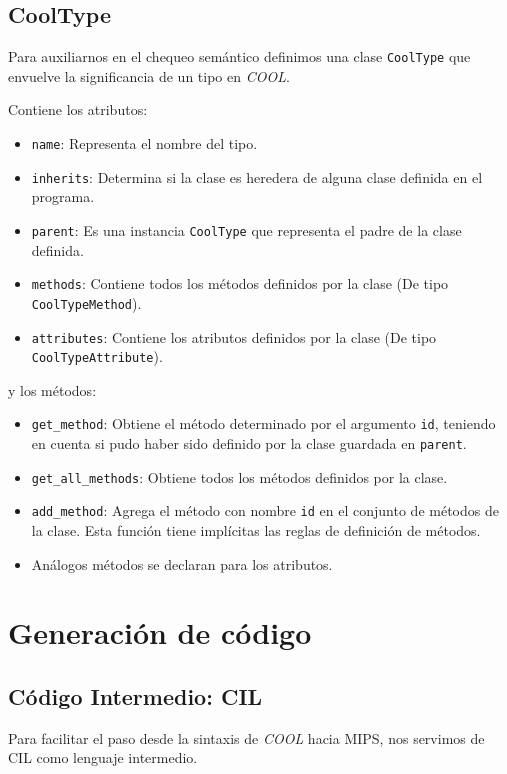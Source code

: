 \documentclass[a4paper,10pt,twocolumn]{article}
\begin{document}
\subsection{CoolType}
Para auxiliarnos en el chequeo semántico definimos una clase \lstinline|CoolType| que envuelve la significancia de un tipo en \textit{COOL}. 

Contiene los atributos:

\begin{itemize}
	\item \lstinline|name|: Representa el nombre del tipo. 
	\item \lstinline|inherits|: Determina si la clase es heredera de alguna clase definida en el programa. 
	\item \lstinline|parent|: Es una instancia \lstinline|CoolType| que representa el padre de la clase definida. 
	\item \lstinline|methods|: Contiene todos los métodos definidos por la clase (De tipo \lstinline|CoolTypeMethod|). 
	\item \lstinline|attributes|: Contiene los atributos definidos por la clase (De tipo \lstinline|CoolTypeAttribute|).
\end{itemize}

y los métodos: 

\begin{itemize}
	\item \lstinline|get_method|: Obtiene el método determinado por el argumento \lstinline|id|, teniendo en cuenta si pudo haber sido definido por la clase guardada en \lstinline|parent|. 
	\item \lstinline|get_all_methods|: Obtiene todos los métodos definidos por la clase. 
	\item \lstinline|add_method|: Agrega el método con nombre \lstinline|id| en el conjunto de métodos de la clase. Esta función tiene implícitas las reglas de definición de métodos. 
	\item Análogos métodos se declaran para los atributos. 
\end{itemize}

\section{Generación de código}

\subsection{Código Intermedio: CIL}
Para facilitar el paso desde la sintaxis de \textit{COOL} hacia MIPS, nos servimos de CIL como lenguaje intermedio. 
\end{document}
